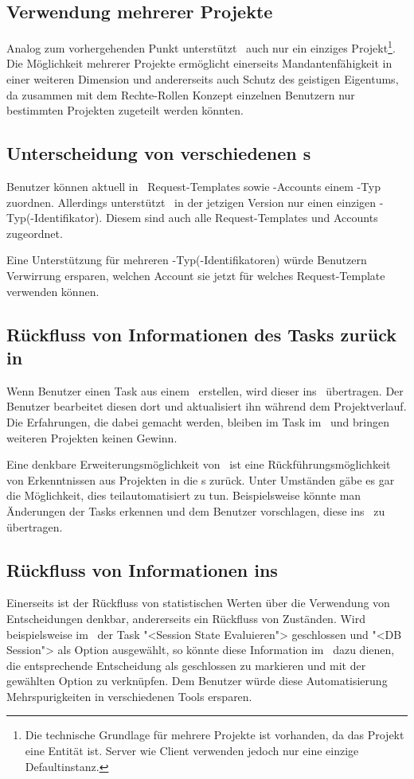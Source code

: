 		\subsection{Verwendung mehrerer Projekte}
			Analog zum vorhergehenden Punkt unterstützt \eeppi\ auch nur ein einziges Projekt\footnote{Die technische Grundlage für mehrere Projekte ist vorhanden, da das Projekt eine Entität ist. Server wie Client verwenden jedoch nur eine einzige Defaultinstanz.}.
			Die Möglichkeit mehrerer Projekte ermöglicht einerseits Mandantenfähigkeit in einer weiteren Dimension und andererseits auch Schutz des geistigen Eigentums, 
			da zusammen mit dem Rechte-Rollen Konzept einzelnen Benutzern nur bestimmten Projekten zugeteilt werden könnten.


		\subsection{Unterscheidung von verschiedenen \ppt s}
			Benutzer können aktuell in \eeppi\ Request-Templates sowie \ppt-Accounts einem \ppt-Typ zuordnen.
			Allerdings unterstützt \eeppi\ in der jetzigen Version nur einen einzigen \ppt-Typ(-Identifikator).
			Diesem sind auch alle Request-Templates und Accounts zugeordnet.
			
			Eine Unterstützung für mehreren \ppt-Typ(-Identifikatoren) würde Benutzern Verwirrung ersparen,
			welchen Account sie jetzt für welches Request-Template verwenden können.
			
			
		\subsection{Rückfluss von Informationen des Tasks zurück in \ttpl}
		\label{subsec:informationFlowbackFeature}
			Wenn Benutzer einen Task aus einem \ttpl\ erstellen, wird dieser ins \ppt\ übertragen.
			Der Benutzer bearbeitet diesen dort und aktualisiert ihn während dem Projektverlauf.
			Die Erfahrungen, die dabei gemacht werden, bleiben im Task im \ppt\
			und bringen weiteren Projekten keinen Gewinn.
			
			Eine denkbare Erweiterungsmöglichkeit von \eeppi\ ist eine Rückführungsmöglichkeit von
			Erkenntnissen aus Projekten in die \ttpl s zurück.
			Unter Umständen gäbe es gar die Möglichkeit, dies teilautomatisiert zu tun.
			Beispielsweise könnte man Änderungen der Tasks erkennen und dem Benutzer vorschlagen, diese ins \eeppi\ zu übertragen.
			
			
		\subsection{Rückfluss von Informationen ins \dks}
		\label{subsec:informationFlowbackFeatureDKS}
			Einerseits ist der Rückfluss von statistischen Werten über die Verwendung von Entscheidungen denkbar, 
			andererseits ein Rückfluss von Zuständen.
			Wird beispielsweise im \ppt\ der Task "<Session State Evaluieren"> geschlossen und "<DB Session"> als Option ausgewählt, 
			so könnte diese Information im \dks\ dazu dienen, 
			die entsprechende Entscheidung als geschlossen zu markieren und mit der gewählten Option zu verknüpfen.
			Dem Benutzer würde diese Automatisierung Mehrspurigkeiten in verschiedenen Tools ersparen.


